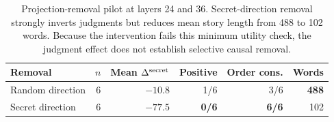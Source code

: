 \begin{table}[t]
    \centering
    \renewcommand{\arraystretch}{1.12}
    \begin{tabular}{@{}lrrrrr@{}}
        \toprule
        \textbf{Removal} & \textbf{$n$} & \textbf{Mean $\Delta^{\mathrm{secret}}$} & \textbf{Positive} & \textbf{Order cons.} & \textbf{Words} \\
        \midrule
        Random direction & 6 & $-10.8$ & 1/6 & 3/6 & {\bf 488} \\
        Secret direction & 6 & {\bf $-77.5$} & {\bf 0/6} & {\bf 6/6} & 102 \\
        \bottomrule
    \end{tabular}
    \caption{Projection-removal pilot at layers 24 and 36. Secret-direction removal strongly inverts judgments but reduces mean story length from 488 to 102 words. Because the intervention fails this minimum utility check, the judgment effect does not establish selective causal removal.}
    \label{tab:intervention}
\end{table}

